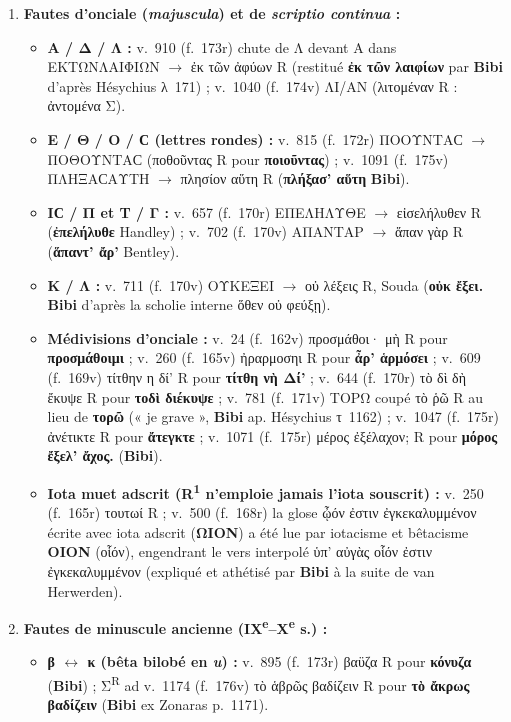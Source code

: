 \documentclass[10pt, a4paper, twoside]{book}
\renewcommand{\_}{\origunderscore\penalty0\relax}
\renewcommand{\texttt}[1]{#1}
\providecommand{\italique}[1]{\emph{#1}}
\providecommand{\lecon}[1]{\textbf{#1}}
\providecommand{\expo}[1]{\textsuperscript{#1}}
\providecommand{\ieme}{\textsuperscript{e}}
\providecommand{\Run}{R\expo{1}}
\begin{document}
\begin{enumerate}
  \item \textbf{Fautes d'onciale (\italique{majuscula}) et de \italique{scriptio continua} :}
  \begin{itemize}
    \item \textbf{Α / Δ / Λ :} v.~910 (\texttt{f.~173r}) chute de Λ devant Α dans ΕΚΤΩΝΛΑΙΦΙΩΝ $\to$ ἐκ τῶν ἀφύων R (restitué \lecon{ἐκ τῶν λαιφίων} par \textbf{Bibi} d'après Hésychius λ~171) ; v.~1040 (\texttt{f.~174v}) ΛΙ/ΑΝ (λιτομέναν R : ἀντομένα Σ).
    \item \textbf{Ε / Θ / Ο / Ϲ (lettres rondes) :} v.~815 (\texttt{f.~172r}) ΠΟΟΥΝΤΑϹ $\to$ ΠΟΘΟΥΝΤΑϹ (ποθοῦντας R pour \lecon{ποιοῦντας}) ; v.~1091 (\texttt{f.~175v}) ΠΛΗΞΑϹΑΥΤΗ $\to$ πλησίον αὕτη R (\lecon{πλήξασ' αὕτη} \textbf{Bibi}).
    \item \textbf{ΙϹ / Π et Τ / Γ :} v.~657 (\texttt{f.~170r}) ΕΠΕΛΗΛΥΘΕ $\to$ εἰσελήλυθεν R (\lecon{ἐπελήλυθε} Handley) ; v.~702 (\texttt{f.~170v}) ΑΠΑΝΤΑΡ $\to$ ἅπαν γὰρ R (\lecon{ἅπαντ' ἄρ'} Bentley).
    \item \textbf{Κ / Λ :} v.~711 (\texttt{f.~170v}) ΟΥΚΕΞΕΙ $\to$ οὐ λέξεις R, Souda (\lecon{οὐκ ἔξει.} \textbf{Bibi} d'après la scholie interne ὅθεν οὐ φεύξῃ).
    \item \textbf{Médivisions d'onciale :} v.~24 (\texttt{f.~162v}) προσμάθοι· μὴ R pour \lecon{προσμάθοιμι} ; v.~260 (\texttt{f.~165v}) ἠραρμοσηι R pour \lecon{ἆρ' ἁρμόσει} ; v.~609 (\texttt{f.~169v}) τίτθην η δί' R pour \lecon{τίτθη νὴ Δί'} ; v.~644 (\texttt{f.~170r}) τὸ δὶ δὴ ἔκυψε R pour \lecon{τοδὶ διέκυψε} ; v.~781 (\texttt{f.~171v}) ΤΟΡΩ coupé τὸ ῥῶ R au lieu de \lecon{τορῶ} (« je grave », \textbf{Bibi} ap. Hésychius τ~1162) ; v.~1047 (\texttt{f.~175r}) ἀνέτικτε R pour \lecon{ἄτεγκτε} ; v.~1071 (\texttt{f.~175r}) μέρος ἐξέλαχον; R pour \lecon{μόρος ἔξελ' ἄχος.} (\textbf{Bibi}).
    \item \textbf{Iota muet adscrit (\Run{} n'emploie jamais l'iota souscrit) :} v.~250 (\texttt{f.~165r}) τουτωί R ; v.~500 (\texttt{f.~168r}) la glose ᾦόν ἐστιν ἐγκεκαλυμμένον écrite avec iota adscrit (\textbf{ΩΙΟΝ}) a été lue par iotacisme et bêtacisme \textbf{ΟΙΟΝ} (οἷόν), engendrant le vers interpolé ὑπ' αὐγὰς οἷόν ἐστιν ἐγκεκαλυμμένον (expliqué et athétisé par \textbf{Bibi} à la suite de van Herwerden).
  \end{itemize}
  \item \textbf{Fautes de minuscule ancienne (IX\ieme{}--X\ieme{} s.) :}
  \begin{itemize}
    \item \textbf{β $\leftrightarrow$ κ (bêta bilobé en \italique{u}) :} v.~895 (\texttt{f.~173r}) βαϋζα R pour \lecon{κόνυζα} (\textbf{Bibi}) ; Σ\textsuperscript{R} ad v.~1174 (\texttt{f.~176v}) τὸ ἁβρῶς βαδίζειν R pour \lecon{τὸ ἄκρως βαδίζειν} (\textbf{Bibi} ex Zonaras p.~1171).

\end{itemize}
\end{enumerate}
\end{document}
